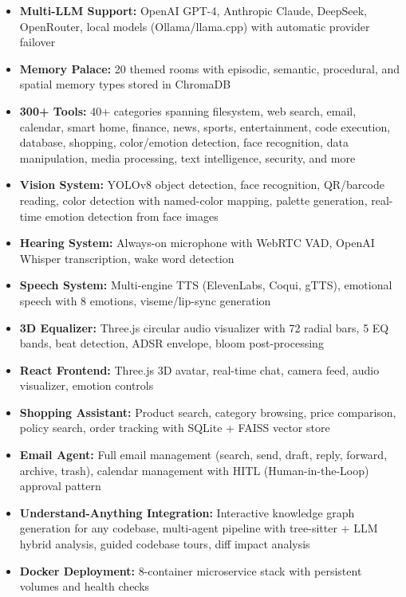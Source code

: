 \documentclass[12pt,a4paper,twoside]{report}
\begin{document}
\begin{itemize}[leftmargin=*]
    \item \textbf{Multi-LLM Support:} OpenAI GPT-4, Anthropic Claude, DeepSeek, OpenRouter, local models (Ollama/llama.cpp) with automatic provider failover
    \item \textbf{Memory Palace:} 20 themed rooms with episodic, semantic, procedural, and spatial memory types stored in ChromaDB
    \item \textbf{300+ Tools:} 40+ categories spanning filesystem, web search, email, calendar, smart home, finance, news, sports, entertainment, code execution, database, shopping, color/emotion detection, face recognition, data manipulation, media processing, text intelligence, security, and more
    \item \textbf{Vision System:} YOLOv8 object detection, face recognition, QR/barcode reading, color detection with named-color mapping, palette generation, real-time emotion detection from face images
    \item \textbf{Hearing System:} Always-on microphone with WebRTC VAD, OpenAI Whisper transcription, wake word detection
    \item \textbf{Speech System:} Multi-engine TTS (ElevenLabs, Coqui, gTTS), emotional speech with 8 emotions, viseme/lip-sync generation
    \item \textbf{3D Equalizer:} Three.js circular audio visualizer with 72 radial bars, 5 EQ bands, beat detection, ADSR envelope, bloom post-processing
    \item \textbf{React Frontend:} Three.js 3D avatar, real-time chat, camera feed, audio visualizer, emotion controls
    \item \textbf{Shopping Assistant:} Product search, category browsing, price comparison, policy search, order tracking with SQLite + FAISS vector store
    \item \textbf{Email Agent:} Full email management (search, send, draft, reply, forward, archive, trash), calendar management with HITL (Human-in-the-Loop) approval pattern
    \item \textbf{Understand-Anything Integration:} Interactive knowledge graph generation for any codebase, multi-agent pipeline with tree-sitter + LLM hybrid analysis, guided codebase tours, diff impact analysis
    \item \textbf{Docker Deployment:} 8-container microservice stack with persistent volumes and health checks
\end{itemize}
\end{document}
